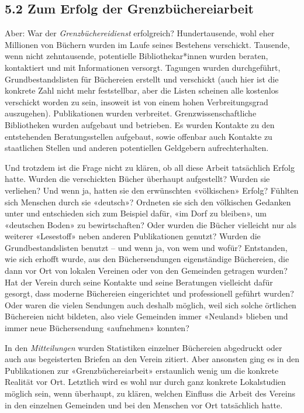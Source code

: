 \documentclass[a4paper,
fontsize=11pt,
oneside,
numbers=noperiodatend,
parskip=half-,
bibliography=totoc,
final
]{scrartcl}
\begin{document}
\hypertarget{zum-erfolg-der-grenzbuxfcchereiarbeit}{%
\subsection{5.2 Zum Erfolg der
Grenzbüchereiarbeit}\label{zum-erfolg-der-grenzbuxfcchereiarbeit}}

Aber: War der \emph{Grenzbüchereidienst} erfolgreich? Hundertausende,
wohl eher Millionen von Büchern wurden im Laufe seines Bestehens
verschickt. Tausende, wenn nicht zehntausende, potentielle
Bibliothekar*innen wurden beraten, kontaktiert und mit Informationen
versorgt. Tagungen wurden durchgeführt, Grundbestandslisten für
Büchereien erstellt und verschickt (auch hier ist die konkrete Zahl
nicht mehr feststellbar, aber die Listen scheinen alle kostenlos
verschickt worden zu sein, insoweit ist von einem hohen Verbreitungsgrad
auszugehen). Publikationen wurden verbreitet. Grenzwissenschaftliche
Bibliotheken wurden aufgebaut und betrieben. Es wurden Kontakte zu den
entstehenden Beratungsstellen aufgebaut, sowie offenbar auch Kontakte zu
staatlichen Stellen und anderen potentiellen Geldgebern
aufrechterhalten.

Und trotzdem ist die Frage nicht zu klären, ob all diese Arbeit
tatsächlich Erfolg hatte. Wurden die verschickten Bücher überhaupt
aufgestellt? Wurden sie verliehen? Und wenn ja, hatten sie den
erwünschten «völkischen» Erfolg? Fühlten sich Menschen durch sie
«deutsch»? Ordneten sie sich den völkischen Gedanken unter und
entschieden sich zum Beispiel dafür, «im Dorf zu bleiben», um «deutschen
Boden» zu bewirtschaften? Oder wurden die Bücher vielleicht nur als
weiterer «Lesestoff» neben anderen Publikationen genutzt? Wurden die
Grundbestandslisten benutzt -- und wenn ja, von wem und wofür?
Entstanden, wie sich erhofft wurde, aus den Büchersendungen
eigenständige Büchereien, die dann vor Ort von lokalen Vereinen oder von
den Gemeinden getragen wurden? Hat der Verein durch seine Kontakte und
seine Beratungen vielleicht dafür gesorgt, dass moderne Büchereien
eingerichtet und professionell geführt wurden? Oder waren die vielen
Sendungen auch deshalb möglich, weil sich solche örtlichen Büchereien
nicht bildeten, also viele Gemeinden immer «Neuland» blieben und immer
neue Büchersendung «aufnehmen» konnten?

In den \emph{Mitteilungen} wurden Statistiken einzelner Büchereien
abgedruckt oder auch aus begeisterten Briefen an den Verein zitiert.
Aber ansonsten ging es in den Publikationen zur «Grenzbüchereiarbeit»
erstaunlich wenig um die konkrete Realität vor Ort. Letztlich wird es
wohl nur durch ganz konkrete Lokalstudien möglich sein, wenn überhaupt,
zu klären, welchen Einfluss die Arbeit des Vereins in den einzelnen
Gemeinden und bei den Menschen vor Ort tatsächlich hatte.
\end{document}
